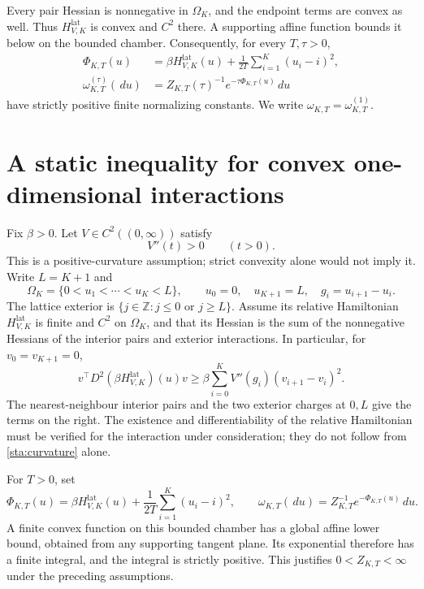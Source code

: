 \documentclass[11pt,reqno]{amsart}
\numberwithin{equation}{section}
\theoremstyle{definition}
\newcommand{\1}{\mathbf 1}
\newcommand{\dd}{\,d}
\begin{document}
Every pair Hessian is nonnegative in $\Omega_K$, and the endpoint
terms are convex as well. Thus $H^{\mathrm{lat}}_{V,K}$ is convex and
$C^2$ there. A supporting affine function bounds it below on the
bounded chamber. Consequently, for every $T,\tau>0$,
\begin{align}
\Phi_{K,T}(u)&=\beta H^{\mathrm{lat}}_{V,K}(u)
+\frac1{2T}\sum_{i=1}^K(u_i-i)^2,\label{def:Phi}\\
\omega_{K,T}^{(\tau)}(\dd u)
&=Z_{K,T}(\tau)^{-1}e^{-\tau\Phi_{K,T}(u)}\dd u
\label{def:omega-tau}
\end{align}
have strictly positive finite normalizing constants. We write
$\omega_{K,T}=\omega_{K,T}^{(1)}$.


\section{A static inequality for convex one-dimensional interactions}
\label{sta:sec-static}\label{sec:static}

Fix $\beta>0$. Let $V\in C^2((0,\infty))$ satisfy
\begin{equation}\label{sta:curvature}
V''(t)>0\qquad(t>0).
\end{equation}
This is a positive-curvature assumption; strict convexity alone would
not imply it. Write $L=K+1$ and
\[
\Omega_K=\{0<u_1<\cdots<u_K<L\},\qquad
u_0=0,\quad u_{K+1}=L,\quad g_i=u_{i+1}-u_i.
\]
The lattice exterior is $\{j\in\mathbb Z:j\le0\text{ or }j\ge L\}$.
Assume its relative Hamiltonian $H^{\mathrm{lat}}_{V,K}$ is finite and
$C^2$ on $\Omega_K$, and that its Hessian is the sum of the
nonnegative Hessians of the interior pairs and exterior interactions.
In particular, for $v_0=v_{K+1}=0$,
\begin{equation}\label{sta:hessian}
v^\top D^2(\beta H^{\mathrm{lat}}_{V,K})(u)v
\ge \beta\sum_{i=0}^K V''(g_i)(v_{i+1}-v_i)^2.
\end{equation}
The nearest-neighbour interior pairs and the two exterior charges at
$0,L$ give the terms on the right. The existence and differentiability
of the relative Hamiltonian must be verified for the interaction under
consideration; they do not follow from \eqref{sta:curvature} alone.

For $T>0$, set
\begin{equation}\label{sta:reference}
\Phi_{K,T}(u)=\beta H^{\mathrm{lat}}_{V,K}(u)
 +\frac1{2T}\sum_{i=1}^K(u_i-i)^2,
\qquad
\omega_{K,T}(\dd u)=Z_{K,T}^{-1}e^{-\Phi_{K,T}(u)}\dd u.
\end{equation}
A finite convex function on this bounded chamber has a global affine
lower bound, obtained from any supporting tangent plane. Its exponential
therefore has a finite integral, and the integral is strictly positive.
This justifies $0<Z_{K,T}<\infty$ under the preceding assumptions.
\end{document}

